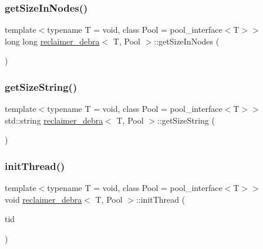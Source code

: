 \subsubsection{\texorpdfstring{get\+Size\+In\+Nodes()}{getSizeInNodes()}}
{\footnotesize\ttfamily template$<$typename T  = void, class Pool  = pool\+\_\+interface$<$\+T$>$$>$ \\
long long \hyperlink{classreclaimer__debra}{reclaimer\+\_\+debra}$<$ T, Pool $>$\+::get\+Size\+In\+Nodes (\begin{DoxyParamCaption}{ }\end{DoxyParamCaption})\hspace{0.3cm}{\ttfamily [inline]}}

\mbox{\label{classreclaimer__debra_a36fe4dd91c4ffcf3dddd2f2660b03880}} 
\subsubsection{\texorpdfstring{get\+Size\+String()}{getSizeString()}}
{\footnotesize\ttfamily template$<$typename T  = void, class Pool  = pool\+\_\+interface$<$\+T$>$$>$ \\
std\+::string \hyperlink{classreclaimer__debra}{reclaimer\+\_\+debra}$<$ T, Pool $>$\+::get\+Size\+String (\begin{DoxyParamCaption}{ }\end{DoxyParamCaption})\hspace{0.3cm}{\ttfamily [inline]}}

\mbox{\label{classreclaimer__debra_a5f6c09cd8120fba870b9162dc1b4232a}} 
\subsubsection{\texorpdfstring{init\+Thread()}{initThread()}}
{\footnotesize\ttfamily template$<$typename T  = void, class Pool  = pool\+\_\+interface$<$\+T$>$$>$ \\
void \hyperlink{classreclaimer__debra}{reclaimer\+\_\+debra}$<$ T, Pool $>$\+::init\+Thread (\begin{DoxyParamCaption}\item[{const int}]{tid }\end{DoxyParamCaption})\hspace{0.3cm}{\ttfamily [inline]}}

